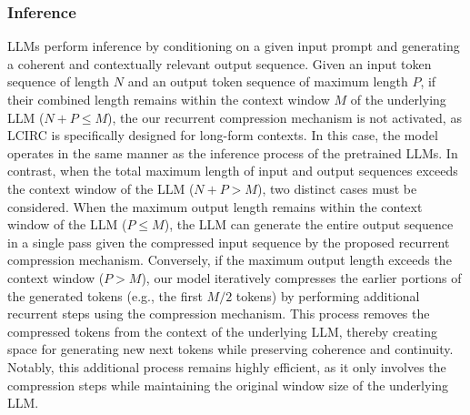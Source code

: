 \subsubsection{Inference}
\label{sec:inference}
LLMs perform inference by conditioning on a given input prompt and generating a coherent and contextually relevant output sequence.
Given an input token sequence of length $N$ and an output token sequence of maximum length $P$, if their combined length remains within the context window $M$ of the underlying LLM ($N+P \le M$), the our recurrent compression mechanism is not activated, as LCIRC is specifically designed for long-form contexts.
In this case, the model operates in the same manner as the inference process of the pretrained LLMs.
In contrast, when the total maximum length of input and output sequences exceeds the context window of the LLM ($N+P > M$), two distinct cases must be considered.
When the maximum output length remains within the context window of the LLM ($P \le M$), the LLM can generate the entire output sequence in a single pass given the compressed input sequence by the proposed recurrent compression mechanism.
Conversely, if the maximum output length exceeds the context window ($P > M$), our model iteratively compresses the earlier portions of the generated tokens (e.g., the first ${M}/{2}$ tokens) by performing additional recurrent steps using the compression mechanism.
This process removes the compressed tokens from the context of the underlying LLM, thereby creating space for generating new next tokens while preserving coherence and continuity. 
Notably, this additional process remains highly efficient, as it only involves the compression steps while maintaining the original window size of the underlying LLM.

